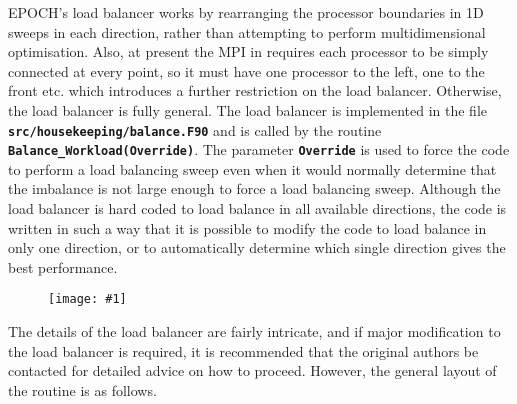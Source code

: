 \documentclass[12pt,a4paper]{article}
\newcommand{\inlinecode}[1]{{\color{warwickred} \bf\texttt{#1}}}
\newcommand{\EPOCH}{{\color{warwickdark}\fontfamily{phv}\selectfont{EPOCH}}}
\newcommand{\image}[1]
  {{\begin{figure}\centering\texttt{[image: \#1]}\end{figure}}}
\begin{document}
EPOCH's load balancer works by rearranging the processor boundaries in 1D
sweeps in each direction, rather than attempting to perform multidimensional
optimisation. Also, at present the MPI in {\EPOCH} requires each processor to be
simply connected at every point, so it must have one processor to the left, one
to the front etc. which introduces a further restriction on the load
balancer. Otherwise, the load balancer is fully general. The load balancer is
implemented in the file \inlinecode{src/housekeeping/balance.F90} and is called
by the routine \inlinecode{Balance\_Workload(Override)}. The parameter
\inlinecode{Override} is used to force the code to perform a load balancing
sweep even when it would normally determine that the imbalance is not large
enough to force a load balancing sweep. Although the load balancer is hard
coded to load balance in all available directions, the code is written in such
a way that it is possible to modify the code to load balance in only one
direction, or to automatically determine which single direction gives the best
performance.

\image{./images/sweep}

The details of the load balancer are fairly intricate, and if major
modification to the load balancer is required, it is recommended that the
original authors be contacted for detailed advice on how to proceed. However,
the general layout of the routine is as follows.
\end{document}

